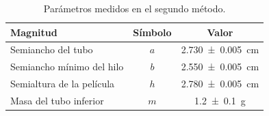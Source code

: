 \begin{table}[H]
    \centering
    \caption{Parámetros medidos en el segundo método.}
    \label{tab:datos_m2}
    \begin{tabular}{lcc}
        \toprule
        \textbf{Magnitud} & \textbf{Símbolo} & \textbf{Valor} \\
        \midrule
        Semiancho del tubo        & $a$ & \qty{2.730 \pm 0.005}{\centi\meter} \\
        Semiancho mínimo del hilo & $b$ & \qty{2.550 \pm 0.005}{\centi\meter} \\
        Semialtura de la película & $h$ & \qty{2.780 \pm 0.005}{\centi\meter} \\
        Masa del tubo inferior    & $m$ & \qty{1.2 \pm 0.1}{\gram}      \\
        \bottomrule
    \end{tabular}
\end{table}